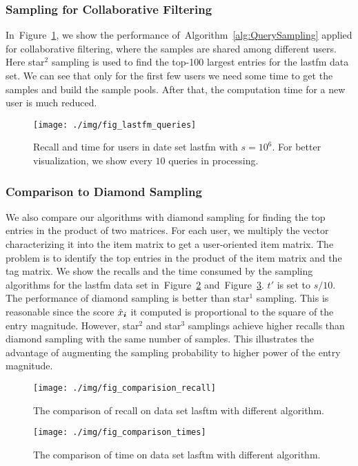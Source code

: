 \documentclass[letterpaper]{article}
\newcommand{\V}[1]{{\boldsymbol{{\MakeLowercase{#1}}}}}
\newcommand{\Fig}[1]{Figure~\ref{fig:#1}}
\newcommand{\Alg}[1]{Algorithm~\ref{alg:#1}}
\begin{document}
\subsubsection{Sampling for Collaborative Filtering}
In~\Fig{Queries}, we show the performance of~\Alg{QuerySampling} 
applied for collaborative filtering, 
where the samples are shared among different users. 
Here star$^2$ sampling is used to find the top-100 largest entries for the lastfm data set. 
We can see that only for the first few users we need some time to get the samples 
and build the sample pools. 
After that, the computation time for a new user is much reduced.
\begin{figure}[]
  \centering
  \texttt{[image: ./img/fig\_lastfm\_queries]}\\
  \caption{Recall and time for users in date set lastfm with $s=10^6$.
           For better visualization,
           we show every $10$ queries in processing.}
  \label{fig:Queries}
\end{figure}
\subsubsection{Comparison to Diamond Sampling}
We also compare our algorithms with diamond sampling for 
finding the top entries in the product of two matrices. 
For each user, we multiply the vector characterizing it into the item matrix 
to get a user-oriented item matrix. 
The problem is to identify the top entries in the product of the item matrix and the tag matrix. 
We show the recalls and the time consumed by the sampling algorithms for the lastfm data set
in~\Fig{Comparison_recall} and~\Fig{Comparison_time}.
$t'$ is set to $s/10$. 
The performance of diamond sampling is better than star$^1$ sampling.
This is reasonable since the score $\hat{x}_{\V{i}}$ it computed is proportional to the square of the entry magnitude. 
However, star$^2$ and star$^3$ samplings achieve higher recalls than diamond sampling with the same number of samples. 
This illustrates the advantage of augmenting the sampling probability to higher power of the entry magnitude.
\begin{figure}[]
  \centering
  \texttt{[image: ./img/fig\_comparision\_recall]}\\
  \caption{The comparison of recall on data set lasftm with different algorithm.}
  \label{fig:Comparison_recall}
\end{figure}
\begin{figure}[]
    \centering
    \texttt{[image: ./img/fig\_comparison\_times]}\\
    \caption{The comparison of time on data set lasftm with different algorithm.}
\label{fig:Comparison_time}
\end{figure}
\end{document}
